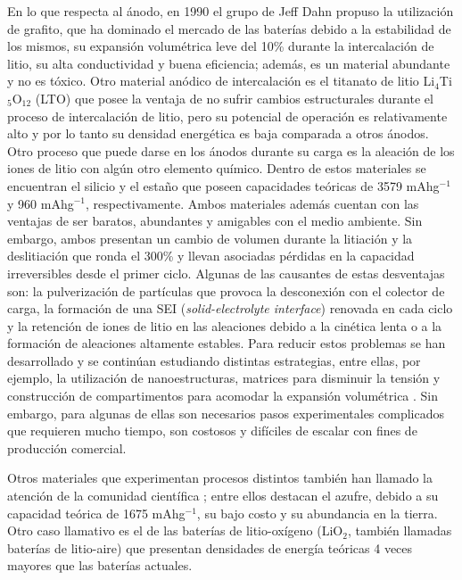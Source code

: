 En lo que respecta al ánodo, en 1990 el grupo de Jeff Dahn \cite{fong1990} propuso 
la utilización de grafito, que ha dominado el mercado de las baterías debido a
la estabilidad de los mismos, su expansión volumétrica leve del 10\% durante 
la intercalación de litio, su alta conductividad y buena eficiencia; además, 
es un material abundante y no es tóxico. Otro material anódico de intercalación 
es el titanato de litio Li$_4$Ti$_5$O$_{12}$ (LTO) que posee la ventaja de 
no sufrir cambios estructurales durante el proceso de intercalación de litio, 
pero su potencial de operación es relativamente alto y por lo tanto su densidad energética es baja comparada a otros ánodos. Otro proceso que
puede darse en los ánodos durante su carga es la aleación de los iones de litio 
con algún otro elemento químico. Dentro de estos materiales se encuentran el silicio y el estaño
que poseen capacidades teóricas de 3579 mAhg$^{-1}$ y 960 mAhg$^{-1}$, 
respectivamente. Ambos materiales además cuentan con las ventajas de ser baratos,
abundantes y amigables con el medio ambiente. Sin embargo, ambos presentan un 
cambio de volumen durante la litiación y la deslitiación que ronda el 300\% y 
llevan asociadas pérdidas en la capacidad irreversibles desde el primer ciclo.
Algunas de las causantes de estas desventajas son: la pulverización de 
partículas que provoca la desconexión con el colector de carga, la formación de 
una SEI (\textit{solid-electrolyte interface}) renovada en cada ciclo y la 
retención de iones de litio en las aleaciones debido a la cinética lenta o a la
formación de aleaciones altamente estables. Para reducir estos problemas se 
han desarrollado y se continúan estudiando distintas estrategias, entre ellas,
por ejemplo, la utilización de nanoestructuras, matrices para disminuir la 
tensión y construcción de compartimentos para acomodar la expansión 
volumétrica \cite{zuo2016}. Sin embargo, para algunas de ellas son necesarios pasos 
experimentales complicados que requieren mucho tiempo, son costosos y difíciles
de escalar con fines de producción comercial.

Otros materiales que experimentan procesos distintos también han llamado la 
atención de la comunidad científica \cite{nitta2015}; entre ellos destacan el 
azufre, debido a su capacidad teórica de 1675 mAhg$^{-1}$, su bajo costo y su 
abundancia en la tierra. Otro caso llamativo es el de las baterías de 
litio-oxígeno (LiO$_2$, también llamadas baterías de litio-aire) que presentan 
densidades de energía teóricas 4 veces mayores que las baterías actuales.

